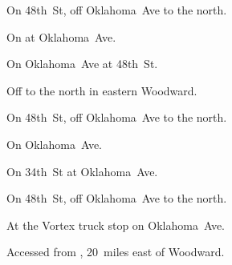 
\begin{LocationList}

On 48th~St, off  Oklahoma~Ave to the north.

On   at  Oklahoma~Ave.

\Location{\GarageHQ \Garage}
On  Oklahoma~Ave at 48th~St.

Off  to the north in eastern Woodward.

On 48th~St, off  Oklahoma~Ave to the north.

On  Oklahoma~Ave.

\Location{\TruckService \Service}
On 34th~St at   Oklahoma~Ave.

On 48th~St, off  Oklahoma~Ave to the north.

At the Vortex truck stop on   Oklahoma~Ave.

Accessed from , 20~miles east of Woodward.

\end{LocationList}
